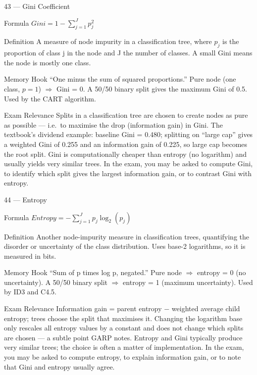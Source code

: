 \documentclass[aspectratio=169,8pt]{beamer}
\begin{document}
	\begin{frame}{43 --- Gini Coefficient}
		\begin{block}{Formula}
			$Gini = 1 - \sum_{j=1}^{J} p_j^2$
		\end{block}
		\begin{block}{Definition}
			A measure of node impurity in a classification tree, where $p_j$ is the proportion of class j in the node and J the number of classes. A small Gini means the node is mostly one class.
		\end{block}
		\begin{block}{Memory Hook}
			``One minus the sum of squared proportions.'' Pure node (one class, $p = 1$) $\Rightarrow$ Gini = 0. A 50/50 binary split gives the maximum Gini of 0.5. Used by the CART algorithm.
		\end{block}
		\begin{block}{Exam Relevance}
			Splits in a classification tree are chosen to create nodes as pure as possible --- i.e.\ to maximise the drop (information gain) in Gini. The textbook's dividend example: baseline Gini = 0.480; splitting on ``large cap'' gives a weighted Gini of 0.255 and an information gain of 0.225, so large cap becomes the root split. Gini is computationally cheaper than entropy (no logarithm) and usually yields very similar trees. In the exam, you may be asked to compute Gini, to identify which split gives the largest information gain, or to contrast Gini with entropy.
		\end{block}
	\end{frame}
	
	\begin{frame}{44 --- Entropy}
		\begin{block}{Formula}
			$Entropy = -\sum_{j=1}^{J} p_j \log_2(p_j)$
		\end{block}
		\begin{block}{Definition}
			Another node-impurity measure in classification trees, quantifying the disorder or uncertainty of the class distribution. Uses base-2 logarithms, so it is measured in bits.
		\end{block}
		\begin{block}{Memory Hook}
			``Sum of p times log p, negated.'' Pure node $\Rightarrow$ entropy = 0 (no uncertainty). A 50/50 binary split $\Rightarrow$ entropy = 1 (maximum uncertainty). Used by ID3 and C4.5.
		\end{block}
		\begin{block}{Exam Relevance}
			Information gain = parent entropy $-$ weighted average child entropy; trees choose the split that maximises it. Changing the logarithm base only rescales all entropy values by a constant and does not change which splits are chosen --- a subtle point GARP notes. Entropy and Gini typically produce very similar trees; the choice is often a matter of implementation. In the exam, you may be asked to compute entropy, to explain information gain, or to note that Gini and entropy usually agree.
		\end{block}
	\end{frame}
	
\end{document}
